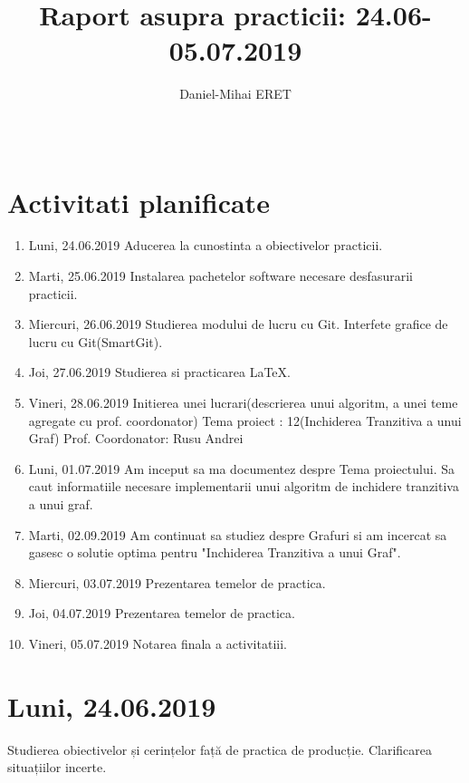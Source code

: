 \documentclass{report}
\title{{\sc Raport asupra practicii: 24.06-05.07.2019}}
\author{ Daniel-Mihai ERET}
\date{\,}
\begin{document}
\maketitle

\tableofcontents

\chapter{Activitati planificate}
\begin{enumerate}
\item Luni, 24.06.2019 \newline
Aducerea la cunostinta a obiectivelor practicii.
\item Marti, 25.06.2019 \newline
Instalarea pachetelor software necesare desfasurarii practicii.
\item Miercuri, 26.06.2019 \newline
Studierea modului de lucru cu Git. Interfete grafice de lucru cu Git(SmartGit).
\item Joi, 27.06.2019 \newline
Studierea si practicarea LaTeX.
\item Vineri, 28.06.2019 \newline
Initierea unei lucrari(descrierea unui algoritm, a unei teme agregate cu prof. coordonator)
Tema proiect : 12(Inchiderea Tranzitiva a unui Graf)
Prof. Coordonator: Rusu Andrei
\item Luni, 01.07.2019 \newline
Am inceput sa ma documentez despre Tema proiectului.
Sa caut informatiile necesare implementarii unui algoritm de inchidere tranzitiva a unui graf.
\item Marti, 02.09.2019\newline
Am continuat sa studiez despre Grafuri si am incercat sa gasesc o solutie optima pentru "Inchiderea Tranzitiva a unui Graf".
\item Miercuri, 03.07.2019\newline
Prezentarea temelor de practica.
\item Joi, 04.07.2019\newline
Prezentarea temelor de practica.
\item Vineri, 05.07.2019\newline
Notarea finala a activitatiii.
\end{enumerate}

\chapter{Luni, 24.06.2019}
Studierea obiectivelor și cerințelor față de practica de producție. Clarificarea situațiilor incerte.
\end{document}
